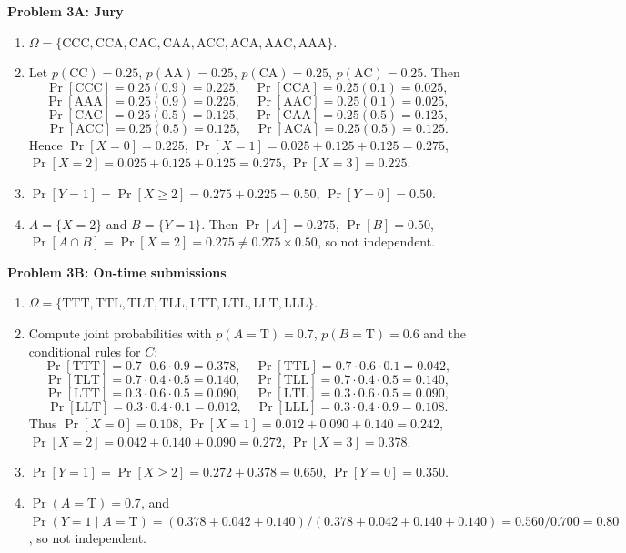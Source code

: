 \documentclass[12pt]{article}
\begin{document}
\vspace{0.5em}
\noindent\textbf{Problem 3A: Jury}
\begin{enumerate}[label=\arabic*\alph*)]
  \item $\Omega=\{\text{CCC}, \text{CCA}, \text{CAC}, \text{CAA}, \text{ACC}, \text{ACA}, \text{AAC}, \text{AAA}\}$.
  \item Let $p(\text{CC})=0.25$, $p(\text{AA})=0.25$, $p(\text{CA})=0.25$, $p(\text{AC})=0.25$. Then
  \[
  \Pr[\text{CCC}]=0.25(0.9)=0.225,\quad
  \Pr[\text{CCA}]=0.25(0.1)=0.025,
  \]
  \[
  \Pr[\text{AAA}]=0.25(0.9)=0.225,\quad
  \Pr[\text{AAC}]=0.25(0.1)=0.025,
  \]
  \[
  \Pr[\text{CAC}]=0.25(0.5)=0.125,\quad
  \Pr[\text{CAA}]=0.25(0.5)=0.125,
  \]
  \[
  \Pr[\text{ACC}]=0.25(0.5)=0.125,\quad
  \Pr[\text{ACA}]=0.25(0.5)=0.125.
  \]
  Hence $\Pr[X=0]=0.225$, $\Pr[X=1]=0.025+0.125+0.125=0.275$, $\Pr[X=2]=0.025+0.125+0.125=0.275$, $\Pr[X=3]=0.225$.
  \item $\Pr[Y=1]=\Pr[X\ge2]=0.275+0.225=0.50$, $\Pr[Y=0]=0.50$.
  \item $A=\{X=2\}$ and $B=\{Y=1\}$. Then $\Pr[A]=0.275$, $\Pr[B]=0.50$, $\Pr[A\cap B]=\Pr[X=2]=0.275 \neq 0.275\times0.50$, so not independent.
\end{enumerate}

\vspace{0.5em}
\noindent\textbf{Problem 3B: On-time submissions}
\begin{enumerate}[label=\arabic*\alph*)]
  \item $\Omega=\{\text{TTT}, \text{TTL}, \text{TLT}, \text{TLL}, \text{LTT}, \text{LTL}, \text{LLT}, \text{LLL}\}$.
  \item Compute joint probabilities with $p(A=\text{T})=0.7$, $p(B=\text{T})=0.6$ and the conditional rules for $C$:
  \[
  \Pr[\text{TTT}]=0.7\cdot0.6\cdot0.9=0.378,\quad
  \Pr[\text{TTL}]=0.7\cdot0.6\cdot0.1=0.042,
  \]
  \[
  \Pr[\text{TLT}]=0.7\cdot0.4\cdot0.5=0.140,\quad
  \Pr[\text{TLL}]=0.7\cdot0.4\cdot0.5=0.140,
  \]
  \[
  \Pr[\text{LTT}]=0.3\cdot0.6\cdot0.5=0.090,\quad
  \Pr[\text{LTL}]=0.3\cdot0.6\cdot0.5=0.090,
  \]
  \[
  \Pr[\text{LLT}]=0.3\cdot0.4\cdot0.1=0.012,\quad
  \Pr[\text{LLL}]=0.3\cdot0.4\cdot0.9=0.108.
  \]
  Thus $\Pr[X=0]=0.108$, $\Pr[X=1]=0.012+0.090+0.140=0.242$, $\Pr[X=2]=0.042+0.140+0.090=0.272$, $\Pr[X=3]=0.378$.
  \item $\Pr[Y=1]=\Pr[X\ge2]=0.272+0.378=0.650$, $\Pr[Y=0]=0.350$.
  \item $\Pr(A=\text{T})=0.7$, and $\Pr(Y=1\mid A=\text{T})=(0.378+0.042+0.140)/(0.378+0.042+0.140+0.140)=0.560/0.700=0.80$, so not independent.
\end{enumerate}
\end{document}
